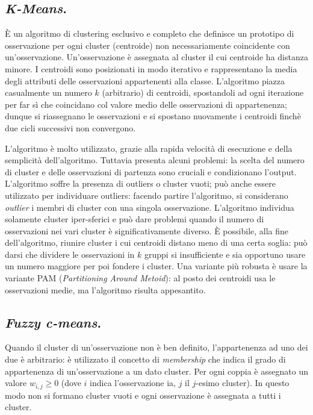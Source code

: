 \documentclass[11pt, a4page, twocolumn]{article}
\begin{document}
\subsection{\textit{K-Means}.}
È un algoritmo di clustering esclusivo e completo che definisce un prototipo di osservazione per ogni cluster (centroide) non necessariamente coincidente con un'osservazione.
Un'osservazione è assegnata al cluster il cui centroide ha distanza minore.
I centroidi sono posizionati in modo iterativo e rappresentano la media degli attributi delle osservazioni appartenenti alla classe.
L'algoritmo piazza casualmente un numero $k$ (arbitrario) di centroidi, spostandoli ad ogni iterazione per far sì che coincidano col valore medio delle osservazioni di appartenenza; dunque si riassegnano le osservazioni e si spostano nuovamente i centroidi finchè due cicli successivi non convergono.

L'algoritmo è molto utilizzato, grazie alla rapida velocità di esecuzione e della semplicità dell'algoritmo.
Tuttavia presenta alcuni problemi: la scelta del numero di cluster e delle osservazioni di partenza sono cruciali e condizionano l'output.
L'algoritmo soffre la presenza di outliers o cluster vuoti; può anche essere utilizzato per individuare outliers: facendo partire l'algoritmo, si considerano \textit{outlier} i membri di cluster con una singola osservazione.
L'algoritmo individua solamente cluster iper-sferici e può dare problemi quando il numero di osservazioni nei vari cluster è significativamente diverso.
È possibile, alla fine dell'algoritmo, riunire cluster i cui centroidi distano meno di una certa soglia: può darsi che dividere le osservazioni in $k$ gruppi si insufficiente e sia opportuno usare un numero maggiore per poi fondere i cluster.
Una variante più robusta è usare la variante PAM (\textit{Partitioning Around Metoid}): al posto dei centroidi usa le osservazioni medie, ma l'algoritmo risulta appesantito.

\subsection{\textit{Fuzzy c-means}.}
Quando il cluster di un'osservazione non è ben definito, l'appartenenza ad uno dei due è arbitrario: è utilizzato il concetto di \textit{membership} che indica il grado di appartenenza di un'osservazione a un dato cluster.
Per ogni coppia è assegnato un valore $w_{i,j} \ge 0$ (dove $i$ indica l'osservazione ia, $j$ il $j$-esimo cluster).
In questo modo non si formano cluster vuoti e ogni osservazione è assegnata a tutti i cluster.
\end{document}

